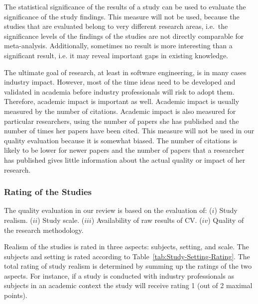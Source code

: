 The statistical significance of the results of a study can be used to evaluate the significance of the study findings.
This measure will not be used, because the studies that are evaluated belong to very different research areas, i.e.\ the significance levels of the findings of the studies are not directly comparable for meta-analysis.
Additionally, sometimes no result is more interesting than a significant result, i.e. it may reveal important gaps in existing knowledge. 


The ultimate goal of research, at least in software engineering, is in many cases industry impact. However, most of the time ideas need to be developed and validated in academia before industry professionals will risk to adopt them. Therefore, academic impact is important as well. Academic impact is usually measured by the number of citations. Academic impact is also measured for particular researchers, using the number of papers she has published and the number of times her papers have been cited.
This measure will not be used in our quality evaluation because it is somewhat biased. The number of citations is likely to be lower for newer papers and the number of papers that a researcher has published gives little information about the actual quality or impact of her research.

\subsubsection{Rating of the Studies}
The quality evaluation in our review is based on the evaluation of: ($i$) Study realism. ($ii$) Study scale. ($iii$) Availability of raw results of CV. ($iv$) Quality of the research methodology.

Realism of the studies is rated in three aspects: subjects, setting, and scale.
The subjects and setting is rated according to Table~\ref{tab:Study-Setting-Rating}. The total rating of study realism is determined by summing up the ratings of the two aspects. For instance, if a study is conducted with industry professionals as subjects in an academic context the study will receive rating 1 (out of 2 maximal points). 

